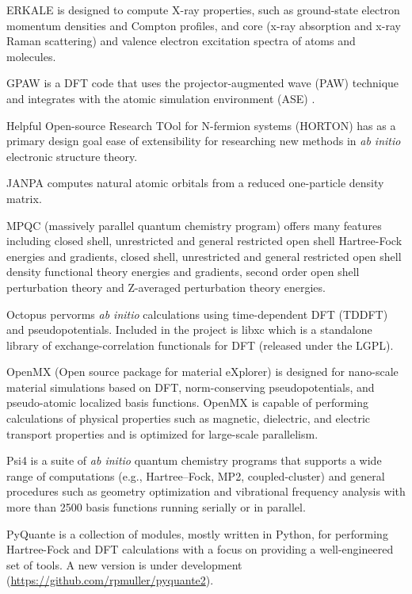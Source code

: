 ERKALE \cite{Lehtola_2012} is designed to compute X-ray properties, such as ground-state electron momentum densities and Compton profiles, and core (x-ray absorption and x-ray Raman scattering) and valence electron excitation spectra of atoms and molecules.

GPAW \cite{gpaw} is a DFT code that uses the projector-augmented wave (PAW) technique \cite{Bl_chl_1994,Kresse_1999} and integrates with the  atomic simulation environment (ASE)  \cite{Bahn_2002}. 

Helpful Open-source Research TOol for N-fermion systems (HORTON) has as a primary design goal ease of extensibility for researching new methods in \textit{ab initio} electronic structure theory.

JANPA \cite{Nikolaienko_2014} computes natural atomic orbitals from a reduced one-particle density matrix.

MPQC (massively parallel quantum chemistry program) \cite{Janssen95} offers many features including closed shell, unrestricted and general restricted open shell Hartree-Fock energies and gradients, closed shell, unrestricted and general restricted open shell density functional theory energies and gradients, second order open shell perturbation theory and Z-averaged perturbation theory energies.

Octopus pervorms \textit{ab initio} calculations using time-dependent DFT (TDDFT) and pseudopotentials.  Included in the project is libxc \cite{Marques_2012} which is a standalone library of exchange-correlation functionals for DFT (released under the LGPL).

OpenMX (Open source package for material eXplorer) \cite{Ozaki_2005} is designed for nano-scale material simulations based on DFT, norm-conserving pseudopotentials, and pseudo-atomic localized basis functions. OpenMX is capable of performing calculations of physical properties such as magnetic, dielectric, and electric transport properties and is optimized for large-scale parallelism.

Psi4 \cite{Turney_2011} is a suite of \textit{ab initio} quantum chemistry programs that supports a wide range of computations (e.g., Hartree–Fock, MP2, coupled-cluster) and general procedures such as geometry optimization and vibrational frequency analysis with more than 2500 basis functions running serially or in parallel.

PyQuante is a collection of modules, mostly written in Python, for performing Hartree-Fock and DFT calculations with a focus on providing a well-engineered set of tools. A new version is under development (\url{https://github.com/rpmuller/pyquante2}).

